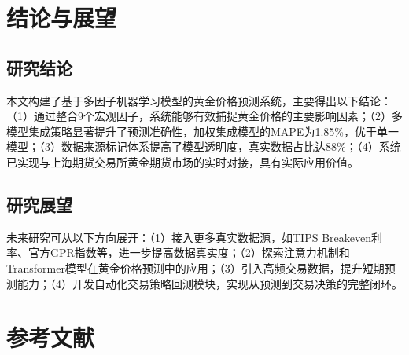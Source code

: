 \documentclass[UTF8,a4paper,12pt]{ctexart}
\begin{document}
\section{结论与展望}

\subsection{研究结论}

本文构建了基于多因子机器学习模型的黄金价格预测系统，主要得出以下结论：（1）通过整合9个宏观因子，系统能够有效捕捉黄金价格的主要影响因素；（2）多模型集成策略显著提升了预测准确性，加权集成模型的MAPE为1.85\%，优于单一模型；（3）数据来源标记体系提高了模型透明度，真实数据占比达88\%；（4）系统已实现与上海期货交易所黄金期货市场的实时对接，具有实际应用价值。

\subsection{研究展望}

未来研究可从以下方向展开：（1）接入更多真实数据源，如TIPS Breakeven利率、官方GPR指数等，进一步提高数据真实度；（2）探索注意力机制和Transformer模型在黄金价格预测中的应用；（3）引入高频交易数据，提升短期预测能力；（4）开发自动化交易策略回测模块，实现从预测到交易决策的完整闭环。

\newpage
\section*{参考文献}
\end{document}
